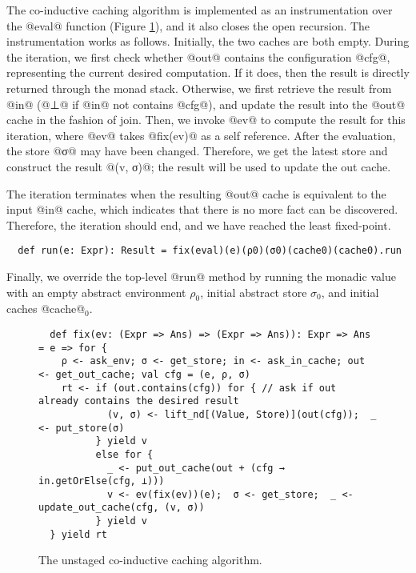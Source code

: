 The co-inductive caching algorithm is implemented as an instrumentation over the
@eval@ function (Figure \ref{fig:coind_cache}), and it also closes the open recursion.
The instrumentation works as follows. Initially, the two caches are both empty.
During the iteration, we first check whether @out@ contains the configuration
@cfg@, representing the current desired computation. If it does, then the result
is directly returned through the monad stack.
Otherwise, we first retrieve the result from @in@ (@⊥@ if @in@ not contains
@cfg@), and update the result into the @out@ cache in the fashion of join.
Then, we invoke @ev@ to compute the result for this iteration, where @ev@ takes
@fix(ev)@ as a self reference.
After the evaluation, the store @σ@ may have been changed. Therefore, 
we get the latest store and construct the result @(v, σ)@; the
result will be used to update the out cache.

The iteration terminates when the resulting @out@ cache is equivalent to the
input @in@ cache, which indicates that there is no more fact can be discovered.
Therefore, the iteration should end, and we have reached the least fixed-point.
\begin{lstlisting}
  def run(e: Expr): Result = fix(eval)(e)(ρ0)(σ0)(cache0)(cache0).run
\end{lstlisting}

Finally, we override the top-level @run@ method by running the monadic value
with an empty abstract environment $\rho_0$, initial abstract store $\sigma_0$,
and initial caches @cache@$_0$.
\begin{figure}[t]
  \centering
\begin{lstlisting}
  def fix(ev: (Expr => Ans) => (Expr => Ans)): Expr => Ans = e => for {
    ρ <- ask_env; σ <- get_store; in <- ask_in_cache; out <- get_out_cache; val cfg = (e, ρ, σ)
    rt <- if (out.contains(cfg)) for { // ask if out already contains the desired result
            (v, σ) <- lift_nd[(Value, Store)](out(cfg));  _ <- put_store(σ)
          } yield v
          else for {
            _ <- put_out_cache(out + (cfg → in.getOrElse(cfg, ⊥)))
            v <- ev(fix(ev))(e);  σ <- get_store;  _ <- update_out_cache(cfg, (v, σ))
          } yield v
  } yield rt
\end{lstlisting}
\vspace{-1em}
\caption{The unstaged co-inductive caching algorithm.}
\label{fig:coind_cache}
\vspace{-1em}
\end{figure}

